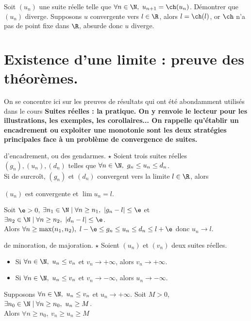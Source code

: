 \documentclass[11pt]{article}
\begin{document}
\begin{ex}{}{}
    Soit $(u_n)$ une suite réelle telle que $\forall n \in \N, ~ u_{n+1} = \ch(u_n)$. Démontrer que $(u_n)$ diverge.
    \tcblower
    Supposons $u$ convergente vers $l\in\R$, alors $l=\ch(l)$, or $\ch$ n'a pas de point fixe dans $\R$, absurde donc $u$ diverge.
\end{ex}

\pagebreak

\section{Existence d'une limite : preuve des théorèmes.}

\quad On se concentre ici sur les preuves de résultats qui ont été abondamment utilisés dans le cours \bf{Suites réelles : la pratique}. On y renvoie le lecteur pour les illustrations, les exemples, les corollaires...\n
\quad On rappelle qu'établir un encadrement ou exploiter une monotonie sont les deux stratégies principales face à un problème de convergence de suites.


\begin{thm}{d'encadrement, ou des gendarmes. $\star$}{}
    Soient trois suites réelles $(g_n), (u_n), (d_n)$ telles que $\forall n\in\N, ~ g_n \leq u_n \leq d_n$.\\
    Si de surcroît, $(g_n)$ et $(d_n)$ convergent vers la limite $l\in\R$, alors
    \begin{center}
        $(u_n)$ est convergente et $\lim u_n = l$.
    \end{center}
    \tcblower
    Soit $\e>0$, $\exists n_1 \in \N \mid \forall n \geq n_1, ~ |g_n - l| \leq \e$ et $\exists n_2 \in \N \mid \forall n \geq n_2, ~ |d_n - l| \leq \e$.\\
    Alors $\forall n \geq \max(n_1, n_2), ~ l - \e \leq g_n \leq  u_n \leq d_n \leq l + \e$ donc $u_n \to l$.
\end{thm}

\begin{prop}{de minoration, de majoration. $\star$}{}
    Soient $(u_n)$ et $(v_n)$ deux suites réelles.
    \begin{itemize}
        \item Si $\forall n \in \N, ~ u_n \leq v_n$ et $v_n \to +\infty$, alors $v_n \to +\infty$.
        \item Si $\forall n \in \N, ~ u_n \leq v_n$ et $v_n \to -\infty$, alors $u_n \to -\infty$.
    \end{itemize}
    \tcblower
    Supposons $\forall n \in \N, ~ u_n \leq v_n$ et $u_n\to+\infty$. Soit $M>0$, $\exists n_0 \in \N \mid \forall n \geq n_0, ~ u_n \geq M$.\\
    Alors $\forall n \geq n_0, ~ v_n \geq u_n \geq M$
\end{prop}
\end{document}
